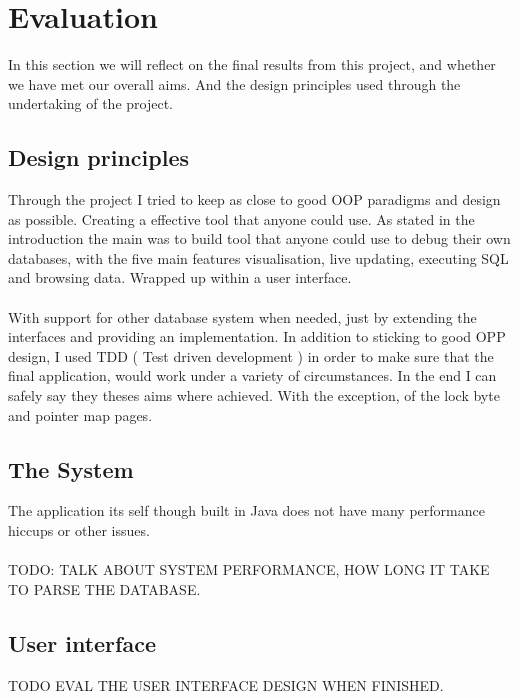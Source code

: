 \section{Evaluation}
\label{sec:evaluation}

In this section we will reflect on the final results from this project, and whether we have met our overall aims. And the design principles used through the undertaking of the project.

\subsection{Design principles}
\label{subsec:design_principles}

Through the project I tried to keep as close to good OOP paradigms and design as possible. Creating a effective tool that anyone could use. As stated in the introduction the main was to build tool that anyone could use to debug their own databases, with the five main features visualisation, live updating, executing SQL and browsing data. Wrapped up within a user interface. 
\\\\
With support for other database system when needed, just by extending the interfaces and providing an implementation. In addition to sticking to good OPP design, I used TDD ( Test driven development ) in order to make sure that the final application, would work under a variety of circumstances. In the end I can safely say they theses aims where achieved. With the exception, of the lock byte and pointer map pages. 

\subsection{The System}
\label{subsec:system_eval}

The application its self though built in Java does not have many performance hiccups or other issues. 
\\\\
TODO: TALK ABOUT SYSTEM PERFORMANCE, HOW LONG IT TAKE TO PARSE THE DATABASE.

\subsection{User interface}
\label{subsec:user_interface_eval}

TODO EVAL THE USER INTERFACE DESIGN WHEN FINISHED.